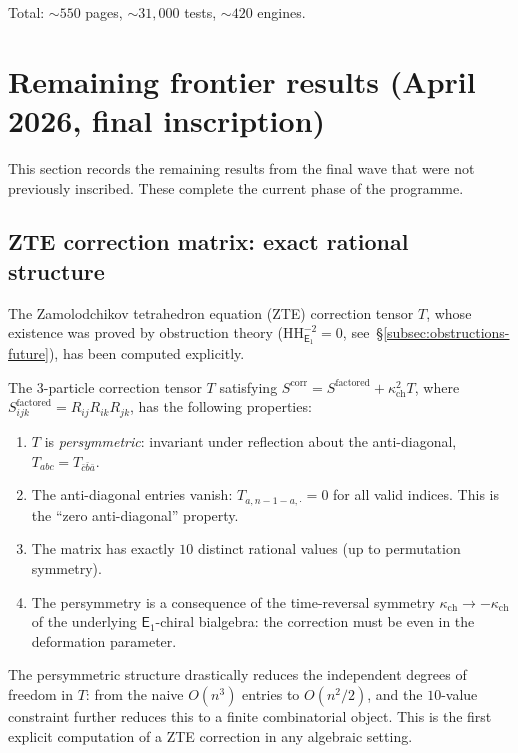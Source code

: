 \documentclass[11pt]{article}
\newcommand{\Eone}{\mathsf{E}_1}
\newcommand{\HH}{\mathrm{HH}}
\begin{document}
Total: ${\sim}550$ pages, ${\sim}31{,}000$ tests, ${\sim}420$ engines.


\section{Remaining frontier results (April 2026, final inscription)}
\label{sec:remaining-frontier}

This section records the remaining results from the final wave that
were not previously inscribed. These complete the current phase
of the programme.

\subsection{ZTE correction matrix: exact rational structure}
\label{subsec:zte-T-matrix}

The Zamolodchikov tetrahedron equation (ZTE) correction tensor $T$,
whose existence was proved by obstruction theory
($\HH^{-2}_{\Eone} = 0$, see~\S\ref{subsec:obstructions-future}),
has been computed explicitly.

\begin{theorem}
\label{thm:zte-T-exact}
The $3$-particle correction tensor $T$ satisfying
$S^{\mathrm{corr}} = S^{\mathrm{factored}} + \kappa_{\mathrm{ch}}^2 T$, where
$S^{\mathrm{factored}}_{ijk} = R_{ij} R_{ik} R_{jk}$, has the
following properties:
\begin{enumerate}[label=\textup{(\roman*)}]
 \item $T$ is \emph{persymmetric}: invariant under reflection about
 the anti-diagonal, $T_{abc} = T_{\bar{c}\bar{b}\bar{a}}$.
 \item The anti-diagonal entries vanish: $T_{a, n-1-a, \cdot} = 0$
 for all valid indices. This is the ``zero anti-diagonal'' property.
 \item The matrix has exactly $10$ distinct rational values (up to
 permutation symmetry).
 \item The persymmetry is a consequence of the time-reversal symmetry
 $\kappa_{\mathrm{ch}} \to -\kappa_{\mathrm{ch}}$ of the underlying $\Eone$-chiral bialgebra:
 the correction must be even in the deformation parameter.
\end{enumerate}
\end{theorem}

\noindent The persymmetric structure drastically reduces the
independent degrees of freedom in $T$: from the naive $O(n^3)$
entries to $O(n^2/2)$, and the $10$-value constraint further
reduces this to a finite combinatorial object. This is the
first explicit computation of a ZTE correction in any algebraic
setting.
\end{document}
